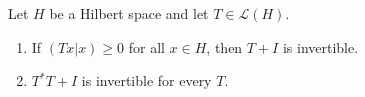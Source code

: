 Let $H$ be a Hilbert space and let $T \in \mathcal{L}(H)$.
\begin{enumerate}
\item[(i)] If $(Tx|x) \geq 0$ for all $x \in H$, then $T + I$ is invertible.
\item[(ii)] $T^*T + I$ is invertible for every $T$.
\end{enumerate}
